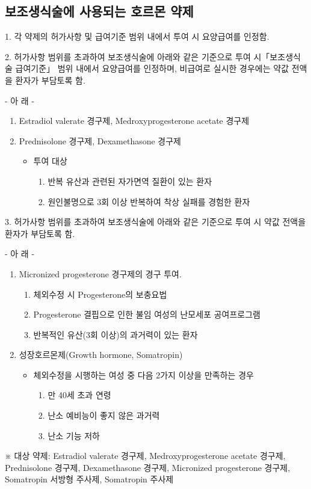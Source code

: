 \subsection{보조생식술에 사용되는 호르몬 약제}
1. 각 약제의 허가사항 및 급여기준 범위 내에서 투여 시 요양급여를 인정함.\par
2. 허가사항 범위를 초과하여 보조생식술에 아래와 같은 기준으로 투여 시「보조생식술 급여기준」 범위 내에서 요양급여를 인정하며, 비급여로 실시한 경우에는 약값 전액을 환자가 부담토록 함.\par
- 아     래 -\par
	\begin{enumerate}[가.]\tightlist
	\item Estradiol valerate 경구제, Medroxyprogesterone acetate 경구제 
	\item Prednisolone 경구제, Dexamethasone 경구제
		\begin{itemize}[○]\tightlist
		\item 투여 대상
			\begin{enumerate}[1)]\tightlist
			\item 반복 유산과 관련된 자가면역 질환이 있는 환자
			\item 원인불명으로 3회 이상 반복하여 착상 실패를 경험한 환자
			\end{enumerate}
		\end{itemize}
	\end{enumerate}	
3. 허가사항 범위를 초과하여 보조생식술에 아래와 같은 기준으로 투여 시 약값 전액을 환자가 부담토록 함.\par
- 아     래 -\par
	\begin{enumerate}[가.]\tightlist
	\item  Micronized progesterone 경구제의 경구 투여.
		\begin{enumerate}[1)]\tightlist
		\item 체외수정 시 Progesterone의 보충요법
		\item Progesterone 결핍으로 인한 불임 여성의 난모세포 공여프로그램
		\item 반복적인 유산(3회 이상)의 과거력이 있는 환자
		\end{enumerate}
	\item  성장호르몬제(Growth hormone, Somatropin)
		\begin{itemize}[○]\tightlist
		\item 체외수정을 시행하는 여성 중 다음 2가지 이상을 만족하는 경우
			\begin{enumerate}[1)]\tightlist
			\item 만 40세 초과 연령
			\item 난소 예비능이 좋지 않은 과거력 
			\item 난소 기능 저하
			\end{enumerate}
		\end{itemize}
	\end{enumerate}	
     ※ 대상 약제: Estradiol valerate 경구제, Medroxyprogesterone acetate 경구제, Prednisolone 경구제, Dexamethasone 경구제, Micronized progesterone 경구제, Somatropin 서방형 주사제, Somatropin 주사제
